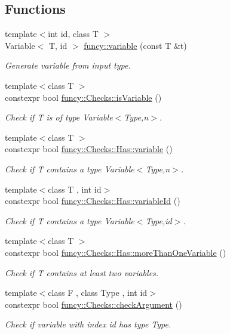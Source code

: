 \subsection*{Functions}
\begin{DoxyCompactItemize}
\item 
{\footnotesize template$<$int id, class T $>$ }\\Variable$<$ T, id $>$ \hyperlink{namespacefuncy_aa3bdcf6464ce819a6888920c4db500d6}{funcy\-::variable} (const T \&t)
\begin{DoxyCompactList}\small\item\em Generate variable from input type. \end{DoxyCompactList}\item 
{\footnotesize template$<$class T $>$ }\\constexpr bool \hyperlink{group__ConceptCheck_gac2bf86dec9e756a91d3e97221b803233}{funcy\-::\-Checks\-::is\-Variable} ()
\begin{DoxyCompactList}\small\item\em Check if T is of type Variable$<$\-Type,n$>$. \end{DoxyCompactList}\item 
{\footnotesize template$<$class T $>$ }\\constexpr bool \hyperlink{namespacefuncy_1_1Checks_1_1Has_aee1e1e2b2bd00a228b2e197ac8aa4cf2}{funcy\-::\-Checks\-::\-Has\-::variable} ()
\begin{DoxyCompactList}\small\item\em Check if T contains a type Variable$<$\-Type,n$>$. \end{DoxyCompactList}\item 
{\footnotesize template$<$class T , int id$>$ }\\constexpr bool \hyperlink{namespacefuncy_1_1Checks_1_1Has_a0f9610f327bf83183326a28d614a1e06}{funcy\-::\-Checks\-::\-Has\-::variable\-Id} ()
\begin{DoxyCompactList}\small\item\em Check if T contains a type Variable$<$\-Type,id$>$. \end{DoxyCompactList}\item 
{\footnotesize template$<$class T $>$ }\\constexpr bool \hyperlink{namespacefuncy_1_1Checks_1_1Has_a44faa6e90d6a83ea1200617a1ebfdc3e}{funcy\-::\-Checks\-::\-Has\-::more\-Than\-One\-Variable} ()
\begin{DoxyCompactList}\small\item\em Check if T contains at least two variables. \end{DoxyCompactList}\item 
{\footnotesize template$<$class F , class Type , int id$>$ }\\constexpr bool \hyperlink{group__ConceptCheck_gaac1dac2cdbc6a9e5555ca15de5e04799}{funcy\-::\-Checks\-::check\-Argument} ()
\begin{DoxyCompactList}\small\item\em Check if variable with index id has type Type. \end{DoxyCompactList}\end{DoxyCompactItemize}
